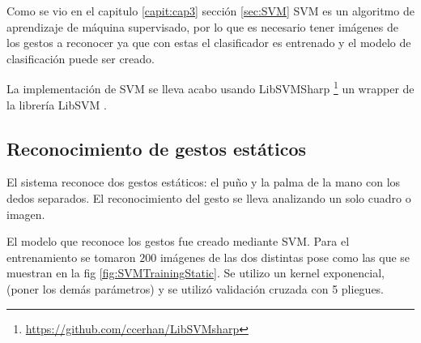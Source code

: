 Como se vio en el capitulo \ref{capit:cap3} sección \ref{sec:SVM} SVM es un algoritmo de aprendizaje de máquina supervisado, por lo que es necesario tener imágenes de los gestos a reconocer ya que con estas el clasificador es entrenado y el modelo de clasificación puede ser creado. 

La implementación de SVM se lleva acabo usando LibSVMSharp \footnote{\url{https://github.com/ccerhan/LibSVMsharp}} un wrapper de la librería LibSVM \citep{Chang2011}.

\subsection{Reconocimiento de gestos estáticos}\label{RecognitionEstatic}

El sistema reconoce dos gestos estáticos: el puño y la palma de la mano con los dedos separados. El reconocimiento del gesto se lleva analizando un solo cuadro o imagen.  

El modelo que reconoce los gestos fue creado mediante SVM. Para el entrenamiento se tomaron $200$ imágenes de las dos distintas pose como las que se muestran en la fig \ref{fig:SVMTrainingStatic}. Se utilizo un kernel exponencial, (poner los demás parámetros) y se utilizó validación cruzada con 5 pliegues.   

